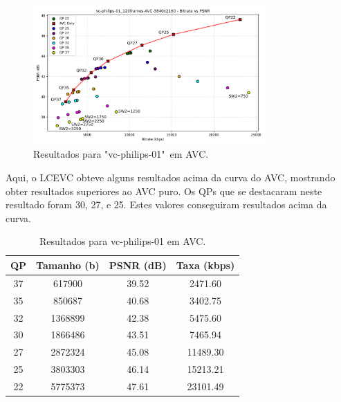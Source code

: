 \begin{figure}[h]
    \centering
    \includegraphics[width=0.79\textwidth]{img/vc-philips-01_120frames-AVC.png}
    \caption{Resultados para "vc-philips-01"\ em \acrshort{AVC}.}
    \label{fig:vc-philips-01}
\end{figure}

\newpage
Aqui, o \acrshort{LCEVC} obteve alguns resultados acima da curva do \acrshort{AVC},
mostrando obter resultados superiores ao \acrshort{AVC} puro. Os QPs que se destacaram
neste resultado foram 30, 27, e 25. Estes valores conseguiram resultados acima da curva.

\begin{table}[h]
    \centering
    \begin{tabular}{|c|c|c|c|}
        \hline
        \textbf{QP} & \textbf{Tamanho (b)} & \textbf{PSNR (dB)} & \textbf{Taxa (kbps)} \\
        \hline
        37 & 617900 & 39.52 & 2471.60 \\
        35 & 850687 & 40.68 & 3402.75 \\
        32 & 1368899 & 42.38 & 5475.60 \\
        30 & 1866486 & 43.51 & 7465.94 \\
        27 & 2872324 & 45.08 & 11489.30 \\
        25 & 3803303 & 46.14 & 15213.21 \\
        22 & 5775373 & 47.61 & 23101.49 \\
        \hline
    \end{tabular}
    \caption{Resultados para vc-philips-01 em AVC.}
    \label{tab:vc-philips-01-avc}
\end{table}

